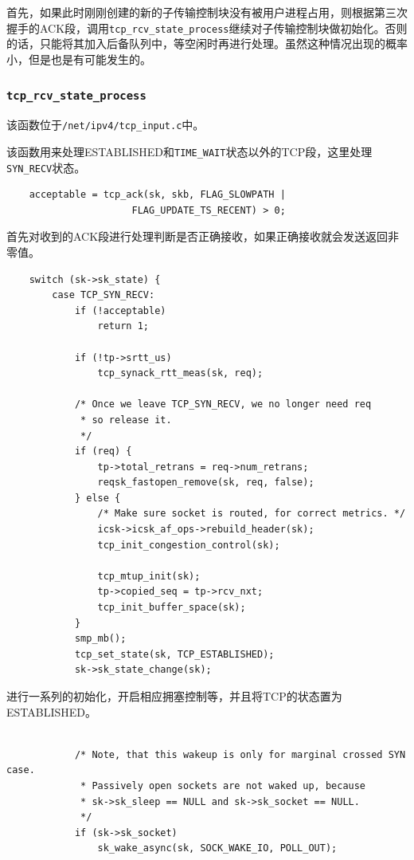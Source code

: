                 首先，如果此时刚刚创建的新的子传输控制块没有被用户进程占用，则根据第三次握手的ACK段，调用\texttt{tcp_rcv_state_process}继续对子传输控制块做初始化。否则的话，只能将其加入后备队列中，等空闲时再进行处理。虽然这种情况出现的概率小，但是也是有可能发生的。

		\subsubsection{\texttt{tcp_rcv_state_process}}

            该函数位于\texttt{/net/ipv4/tcp_input.c}中。
            
            该函数用来处理ESTABLISHED和\texttt{TIME_WAIT}状态以外的TCP段，这里处理\texttt{SYN_RECV}状态。

\begin{verbatim}
    acceptable = tcp_ack(sk, skb, FLAG_SLOWPATH |
                      FLAG_UPDATE_TS_RECENT) > 0;
\end{verbatim}

    首先对收到的ACK段进行处理判断是否正确接收，如果正确接收就会发送返回非零值。

\begin{verbatim}
    switch (sk->sk_state) {
        case TCP_SYN_RECV:
            if (!acceptable)
                return 1;

            if (!tp->srtt_us)
                tcp_synack_rtt_meas(sk, req);

            /* Once we leave TCP_SYN_RECV, we no longer need req
             * so release it.
             */
            if (req) {
                tp->total_retrans = req->num_retrans;
                reqsk_fastopen_remove(sk, req, false);
            } else {
                /* Make sure socket is routed, for correct metrics. */
                icsk->icsk_af_ops->rebuild_header(sk);
                tcp_init_congestion_control(sk);

                tcp_mtup_init(sk);
                tp->copied_seq = tp->rcv_nxt;
                tcp_init_buffer_space(sk);
            }
            smp_mb();
            tcp_set_state(sk, TCP_ESTABLISHED);
            sk->sk_state_change(sk);
\end{verbatim}

    进行一系列的初始化，开启相应拥塞控制等，并且将TCP的状态置为ESTABLISHED。

\begin{verbatim}

            /* Note, that this wakeup is only for marginal crossed SYN case.
             * Passively open sockets are not waked up, because
             * sk->sk_sleep == NULL and sk->sk_socket == NULL.
             */
            if (sk->sk_socket)
                sk_wake_async(sk, SOCK_WAKE_IO, POLL_OUT);
\end{verbatim}

